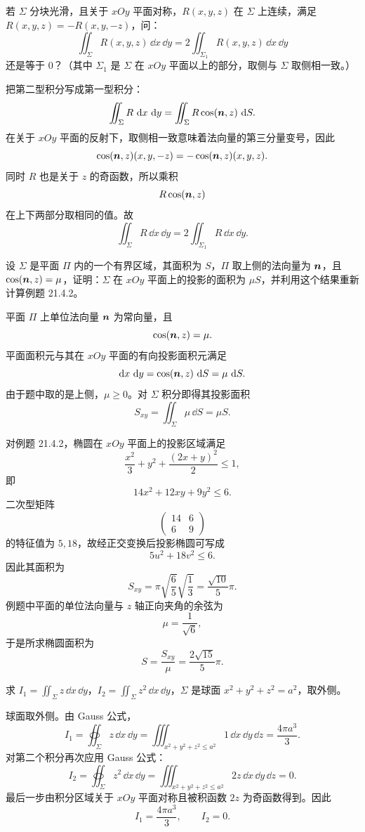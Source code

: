 \begin{xexercise}[3]
若 $\Sigma$ 分块光滑，且关于 $xOy$ 平面对称，$R(x,y,z)$ 在 $\Sigma$ 上连续，满足 $R(x,y,z)=-R(x,y,-z)$，问：
\[
  \iint_\Sigma R(x,y,z)\,\dd x\,\dd y=2\iint_{\Sigma_1}R(x,y,z)\,\dd x\,\dd y
\]
还是等于 $0$？（其中 $\Sigma_1$ 是 $\Sigma$ 在 $xOy$ 平面以上的部分，取侧与 $\Sigma$ 取侧相一致。）
\end{xexercise}
\begin{xsolution}
把第二型积分写成第一型积分：
\[
  \iint_\Sigma R\,\mathop{}\!\mathrm{d} x\,\mathop{}\!\mathrm{d} y
  =\iint_\Sigma R\cos(\bm{n},z)\,\mathop{}\!\mathrm{d} S.
\]
在关于 $xOy$ 平面的反射下，取侧相一致意味着法向量的第三分量变号，因此
\[
  \cos(\bm{n},z)(x,y,-z)=-\cos(\bm{n},z)(x,y,z).
\]
同时 $R$ 也是关于 $z$ 的奇函数，所以乘积
\[
  R\cos(\bm{n},z)
\]
在上下两部分取相同的值。故
\[
  \boxed{
  \iint_\Sigma R\,\dd x\,\dd y
  =2\iint_{\Sigma_1}R\,\dd x\,\dd y}.
\]
\end{xsolution}


\begin{xexercise}[4]
设 $\Sigma$ 是平面 $\Pi$ 内的一个有界区域，其面积为 $S$，$\Pi$ 取上侧的法向量为 $\bm{n}$，且 $\cos(\bm{n},z)=\mu$，证明：$\Sigma$ 在 $xOy$ 平面上的投影的面积为 $\mu S$，并利用这个结果重新计算例题 21.4.2。
\end{xexercise}
\begin{xsolution}
平面 $\Pi$ 上单位法向量 $\bm{n}$ 为常向量，且
\[
  \cos(\bm{n},z)=\mu.
\]
平面面积元与其在 $xOy$ 平面的有向投影面积元满足
\[
  \mathop{}\!\mathrm{d} x\,\mathop{}\!\mathrm{d} y=\cos(\bm{n},z)\,\mathop{}\!\mathrm{d} S=\mu\,\mathop{}\!\mathrm{d} S.
\]
由于题中取的是上侧，$\mu\ge0$。对 $\Sigma$ 积分即得其投影面积
\[
  S_{xy}=\iint_\Sigma\mu\,\dd S=\mu S.
\]

对例题 21.4.2，椭圆在 $xOy$ 平面上的投影区域满足
\[
  \frac{x^2}{3}+y^2+\frac{(2x+y)^2}{2}\le1,
\]
即
\[
  14x^2+12xy+9y^2\le6.
\]
二次型矩阵
\[
  \begin{pmatrix}14&6\\6&9\end{pmatrix}
\]
的特征值为 $5,18$，故经正交变换后投影椭圆可写成
\[
  5u^2+18v^2\le6.
\]
因此其面积为
\[
  S_{xy}=\pi\sqrt{\frac65}\sqrt{\frac13}
  =\frac{\sqrt{10}}5\pi.
\]
例题中平面的单位法向量与 $z$ 轴正向夹角的余弦为
\[
  \mu=\frac1{\sqrt6},
\]
于是所求椭圆面积为
\[
  \boxed{S=\frac{S_{xy}}\mu=\frac{2\sqrt{15}}5\pi}.
\]
\end{xsolution}


\begin{xexercise}[5]
求 $I_1=\iint_\Sigma z\,\dd x\,\dd y$，$I_2=\iint_\Sigma z^2\,\dd x\,\dd y$，$\Sigma$ 是球面 $x^2+y^2+z^2=a^2$，取外侧。
\end{xexercise}
\begin{xsolution}
球面取外侧。由 Gauss 公式，
\[
  I_1=\oiint_\Sigma z\,\dd x\,\dd y
  =\iiint_{x^2+y^2+z^2\le a^2}1\,\dd x\,\dd y\,\dd z
  =\frac{4\pi a^3}{3}.
\]
对第二个积分再次应用 Gauss 公式：
\[
  I_2=\oiint_\Sigma z^2\,\dd x\,\dd y
  =\iiint_{x^2+y^2+z^2\le a^2}2z\,\dd x\,\dd y\,\dd z=0.
\]
最后一步由积分区域关于 $xOy$ 平面对称且被积函数 $2z$ 为奇函数得到。因此
\[
  \boxed{I_1=\frac{4\pi a^3}{3},\qquad I_2=0}.
\]
\end{xsolution}


